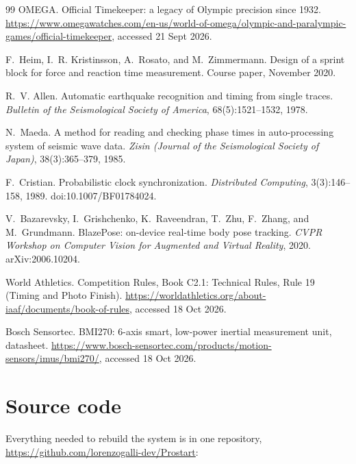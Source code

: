 \documentclass[9pt,a4paper]{extarticle}
\begin{document}
{\begin{thebibliography}{99}
 OMEGA.
\newblock Official Timekeeper: a legacy of Olympic precision since 1932.
\newblock \url{https://www.omegawatches.com/en-us/world-of-omega/olympic-and-paralympic-games/official-timekeeper}, accessed 21 Sept 2026.

 F.~Heim, I.~R. Kristinsson, A.~Rosato, and M.~Zimmermann.
\newblock Design of a sprint block for force and reaction time measurement.
\newblock Course paper, November 2020.

 R.~V. Allen.
\newblock Automatic earthquake recognition and timing from single traces.
\newblock \emph{Bulletin of the Seismological Society of America}, 68(5):1521--1532, 1978.

 N.~Maeda.
\newblock A method for reading and checking phase times in auto-processing system of seismic wave data.
\newblock \emph{Zisin (Journal of the Seismological Society of Japan)}, 38(3):365--379, 1985.

 F.~Cristian.
\newblock Probabilistic clock synchronization.
\newblock \emph{Distributed Computing}, 3(3):146--158, 1989.
\newblock doi:10.1007/BF01784024.

 V.~Bazarevsky, I.~Grishchenko, K.~Raveendran, T.~Zhu, F.~Zhang, and M.~Grundmann.
\newblock BlazePose: on-device real-time body pose tracking.
\newblock \emph{CVPR Workshop on Computer Vision for Augmented and Virtual Reality}, 2020. arXiv:2006.10204.

 World Athletics.
\newblock Competition Rules, Book C2.1: Technical Rules, Rule 19 (Timing and Photo Finish).
\newblock \url{https://worldathletics.org/about-iaaf/documents/book-of-rules}, accessed 18 Oct 2026.

 Bosch Sensortec.
\newblock BMI270: 6-axis smart, low-power inertial measurement unit, datasheet.
\newblock \url{https://www.bosch-sensortec.com/products/motion-sensors/imus/bmi270/}, accessed 18 Oct 2026.

\end{thebibliography}
}

\clearpage
\appendix
\section{Source code}
\label{app:code}

Everything needed to rebuild the system is in one repository, \url{https://github.com/lorenzogalli-dev/Prostart}:
\end{document}
